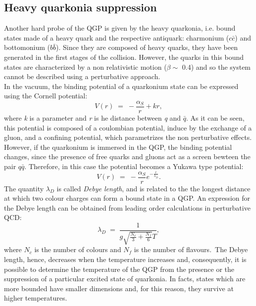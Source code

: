 \subsection{Heavy quarkonia suppression}
Another hard probe of the QGP is given by the heavy quarkonia, i.e. bound states made of a heavy quark and the respective antiquark: charmonium ($c\bar{c}$) and bottomonium ($b\bar{b}$). Since they are composed of heavy quarks, they have been generated in the first stages of the collision. However, the quarks in this bound states are characterized by a non relativistic motion ($\beta\sim$ 0.4) and so the system cannot be described using a perturbative approach.\\
In the vacuum, the binding potential of a quarkonium state can be expressed using the Cornell potential:
\begin{equation}
 V(r)\;=\;-\frac{\alpha_{S}}{r}+kr,
\end{equation}
where \textit{k} is a parameter and \textit{r} is he distance between \textit{q} and $\bar{q}$.
As it can be seen, this potential is composed of a coulombian potential, induce by the exchange of a gluon, and a confining potential, which parametrizes the non perturbative effects.\\
However, if the quarkonium is immersed in the QGP, the binding potential changes, since the presence of free quarks and gluons act as a screen bewteen the pair $q\bar{q}$. Therefore, in this case the potential becomes a Yukawa type potential:
\begin{equation}
 V(r)\;=\;-\frac{\alpha_{S}}{r}e^{-\frac{r}{\lambda_{D}}}.
\end{equation}
The quantity $\lambda_{D}$ is called \textit{Debye length}, and is related to the the longest distance at which two colour charges can form a bound state in a QGP. An expression for the Debye length can be obtained from leading order calculations in perturbative QCD:
\begin{equation}
 \lambda_{D}\;=\;\frac{1}{g\sqrt{\frac{N_{c}}{3}+\frac{N_{f}}{6}}T},
\end{equation}
where $N_{c}$ is the number of colours and $N_{f}$ is the number of flavours.\
The Debye length, hence, decreases when the temperature increases and, consequently, it is possible to determine the temperature of the QGP from the presence or the suppression of a particular excited state of quarkonia. In facts, states which are more bounded have smaller dimensions and, for this reason, they survive at higher temperatures.\\
